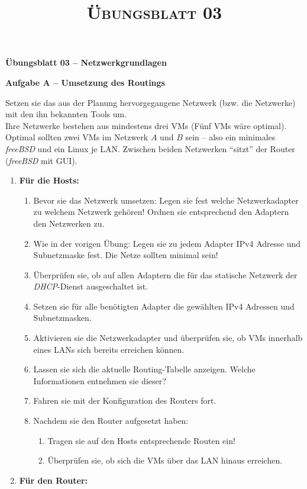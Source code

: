 \documentclass[paper=a4,fontsize=11pt]{scrartcl}%
\title{	
\normalfont \normalsize 
\textsc{Übungsblatt 03}
}
\begin{document}
\begin{center}
\Large{\textbf{Übungsblatt 03 -- Netzwerkgrundlagen}}
\end{center}
\begin{center}\Large{\textbf{Aufgabe A -- Umsetzung des Routings}}\end{center}\vskip0.25in
Setzen sie das aus der Planung hervorgegangene Netzwerk (bzw. die Netzwerke) mit den ihn bekannten Tools um.\\
Ihre Netzwerke bestehen aus mindestens drei VMs (Fünf VMs wäre optimal). Optimal sollten zwei VMs im Netzwerk $A$ und $B$ sein -- also ein minimales \emph{freeBSD} und ein Linux je LAN. Zwischen beiden Netzwerken \enquote{sitzt} der Router (\emph{freeBSD} mit GUI).
\begin{enumerate}
	\item \textbf{Für die Hosts:}\\
	\begin{enumerate}
		\item Bevor sie das Netzwerk umsetzen: Legen sie fest welche Netzwerkadapter zu welchem Netzwerk gehören! Ordnen sie entsprechend den Adaptern den Netzwerken zu.
		\item Wie in der vorigen Übung: Legen sie zu jedem Adapter IPv4 Adresse und Subnetzmaske fest. Die Netze sollten minimal sein!
		\item Überprüfen sie, ob auf allen Adaptern die für das statische Netzwerk der \emph{DHCP}-Dienst ausgeschaltet ist.
		\item Setzen sie für alle benötigten Adapter die gewählten IPv4 Adressen und Subnetzmasken.
		\item Aktivieren sie die Netzwerkadapter und überprüfen sie, ob VMs innerhalb eines LANs sich bereits erreichen können.
		\item Lassen sie sich die aktuelle Routing-Tabelle anzeigen. Welche Informationen entnehmen sie dieser?
		\item Fahren sie mit der Konfiguration des Routers fort.
		\item Nachdem sie den Router aufgesetzt haben:
		\begin{enumerate}
			\item Tragen sie auf den Hosts entsprechende Routen ein!
			\item Überprüfen sie, ob sich die VMs über das LAN hinaus erreichen.
		\end{enumerate}
	\end{enumerate}
	\item \textbf{Für den Router:}\\

\end{enumerate}
\end{document}
